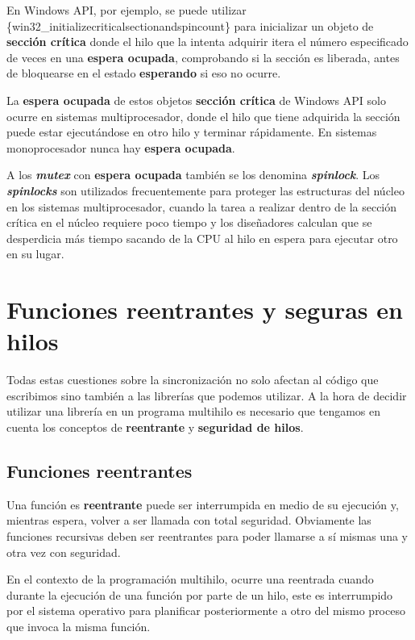 En Windows API, por ejemplo, se puede utilizar
\{win32\_initializecriticalsectionandspincount\} para inicializar un
objeto de \textbf{sección crítica} donde el hilo que la intenta adquirir
itera el número especificado de veces en una \textbf{espera ocupada},
comprobando si la sección es liberada, antes de bloquearse en el estado
\textbf{esperando} si eso no ocurre.

La \textbf{espera ocupada} de estos objetos \textbf{sección crítica} de
Windows API solo ocurre en sistemas multiprocesador, donde el hilo que
tiene adquirida la sección puede estar ejecutándose en otro hilo y
terminar rápidamente. En sistemas monoprocesador nunca hay
\textbf{espera ocupada}.

A los \textbf{\emph{mutex}} con \textbf{espera ocupada} también se los
denomina \textbf{\emph{{}spinlock}}. Los \textbf{\emph{spinlocks}} son
utilizados frecuentemente para proteger las estructuras del núcleo en
los sistemas multiprocesador, cuando la tarea a realizar dentro de la
sección crítica en el núcleo requiere poco tiempo y los diseñadores
calculan que se desperdicia más tiempo sacando de la CPU al hilo en
espera para ejecutar otro en su lugar.

\section{Funciones reentrantes y seguras en
hilos}\label{_funciones_reentrantes_y_seguras_en_hilos}

Todas estas cuestiones sobre la sincronización no solo afectan al código
que escribimos sino también a las librerías que podemos utilizar. A la
hora de decidir utilizar una librería en un programa multihilo es
necesario que tengamos en cuenta los conceptos de \textbf{reentrante} y
\textbf{seguridad de hilos}.

\subsection{Funciones reentrantes}\label{_funciones_reentrantes}

{} {} Una función es \textbf{reentrante} puede ser interrumpida en medio
de su ejecución y, mientras espera, volver a ser llamada con total
seguridad. Obviamente las funciones recursivas deben ser reentrantes
para poder llamarse a sí mismas una y otra vez con seguridad.

En el contexto de la programación multihilo, ocurre una reentrada cuando
durante la ejecución de una función por parte de un hilo, este es
interrumpido por el sistema operativo para planificar posteriormente a
otro del mismo proceso que invoca la misma función.


